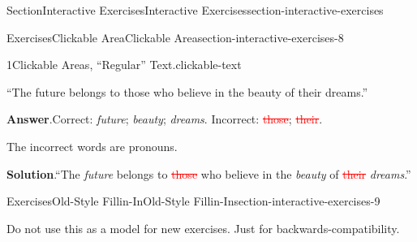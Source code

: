 \documentclass[twoside,10pt,]{article}
\newcommand{\blocktitlefont}{\relax}
\newcommand{\mono}[1]{\texttt{#1}}
\newcommand{\deletethick}{.25ex}
\newcommand{\deleted}[1]{\renewcommand{\ULthickness}{\deletethick}\textcolor{red}{\sout{#1}}}
\newlength{\fillinmaxwidth}
\newlength{\fillincontract}
\newlength{\charmaxwidth}\setlength{\charmaxwidth}{0.5em}
\newlength{\charminwidth}\setlength{\charminwidth}{0.1em}
\newlength{\fillinheight}
\newcommand{\fillintext}[1]{%
\setlength{\fillinmaxwidth}{#1\charmaxwidth}%
\setlength{\fillincontract}{#1\charminwidth}%
\setlength{\fillinheight}{\baselineskip}\addtolength{\fillinheight}{1.2pt}%
\strut\nobreak\leaders\vbox{\hrule width 0.3pt height 0.3pt \vskip -1.2pt}\hskip 1\fillinmaxwidth minus \fillincontract\nobreak\strut%
}
\numberwithin{equation}{section}
\begin{document}
\begin{sectionptx}{Section}{Interactive Exercises}{}{Interactive Exercises}{}{}{section-interactive-exercises}
\begin{exercises-subsection}{Exercises}{Clickable Area}{}{Clickable Area}{}{}{section-interactive-exercises-8}
\begin{divisionexercise}{1}{Clickable Areas, ``Regular'' Text.}{}{clickable-text}
\par
``The future belongs to those who believe in the beauty of their dreams.''%
\par\smallskip%
\noindent\textbf{\blocktitlefont Answer}.\hypertarget{clickable-text-3}{}\quad{}Correct: \emph{future}; \emph{beauty}; \emph{dreams}. Incorrect: \deleted{those}; \deleted{their}.%
\par
The incorrect words are pronouns.%
\par\smallskip%
\noindent\textbf{\blocktitlefont Solution}.\hypertarget{clickable-text-4}{}\quad{}``The \emph{future} belongs to \deleted{those} who believe in the \emph{beauty} of \deleted{their} \emph{dreams}.''%
\end{divisionexercise}%
\end{exercises-subsection}
%
%
\typeout{************************************************}
\typeout{************************************************}
%
\begin{exercises-subsection}{Exercises}{Old-Style Fillin-In}{}{Old-Style Fillin-In}{}{}{section-interactive-exercises-9}
\begin{introduction}{}%
Do not use this as a model for new exercises.  Just for backwards-compatibility.%
\end{introduction}%
%
\end{exercises-subsection}
%
%
\typeout{************************************************}

\end{sectionptx}
\end{document}
